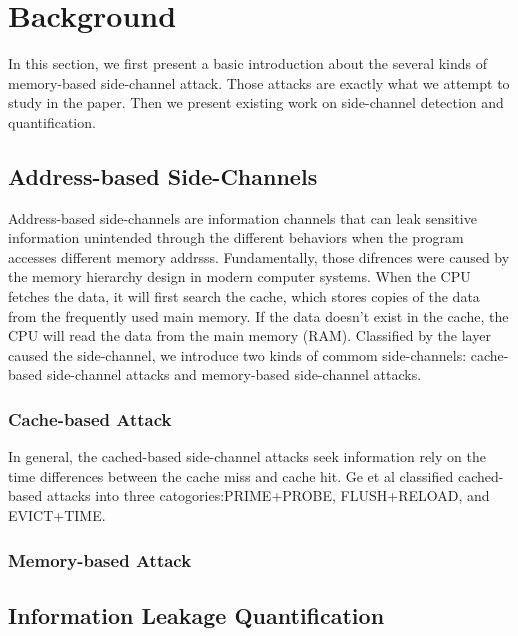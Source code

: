 \section{Background}
In this section, we first present a basic introduction about the several kinds of memory-based side-channel attack.
Those attacks are exactly what we attempt to study in the paper. Then we present existing work on side-channel 
detection and quantification.  
\subsection{Address-based Side-Channels}
Address-based side-channels are information channels that can leak sensitive information unintended
through the different behaviors when the program accesses different memory addrsss. Fundamentally,
those difrences were caused by the memory hierarchy design in modern computer systems. When the 
CPU fetches the data, it will first search the cache, which stores copies of the data from 
the frequently used main memory. If the data doesn't exist in the cache, the CPU will read
the data from the main memory (RAM). Classified by the layer caused the side-channel, we 
introduce two kinds of commom side-channels: cache-based side-channel attacks and memory-based
side-channel attacks.

\subsubsection{Cache-based Attack}
In general, the cached-based side-channel attacks seek information 
rely on the time differences between the cache miss
and cache hit. Ge et al \cite{DBLP:journals/jce/GeYCH18} classified
cached-based attacks into three catogories:PRIME+PROBE, FLUSH+RELOAD,
and EVICT+TIME.


\subsubsection{Memory-based Attack}

\subsection{Information Leakage Quantification}

